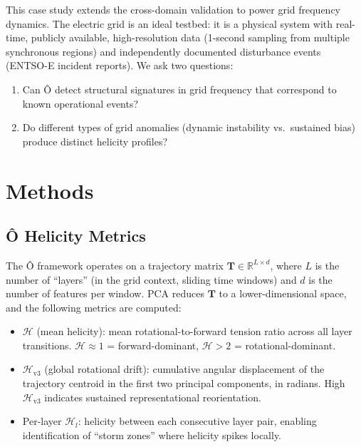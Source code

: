 \documentclass[11pt,a4paper]{article}
\begin{document}
This case study extends the cross-domain validation to power grid frequency dynamics. The electric grid is an ideal testbed: it is a physical system with real-time, publicly available, high-resolution data (1-second sampling from multiple synchronous regions) and independently documented disturbance events (ENTSO-E incident reports). We ask two questions:

\begin{enumerate}[label=(\arabic*)]
    \item Can Ô detect structural signatures in grid frequency that correspond to known operational events?
    \item Do different types of grid anomalies (dynamic instability vs.\ sustained bias) produce distinct helicity profiles?
\end{enumerate}

\section{Methods}

\subsection{Ô Helicity Metrics}

The Ô framework operates on a trajectory matrix $\mathbf{T} \in \mathbb{R}^{L \times d}$, where $L$ is the number of ``layers'' (in the grid context, sliding time windows) and $d$ is the number of features per window. PCA reduces $\mathbf{T}$ to a lower-dimensional space, and the following metrics are computed:

\begin{itemize}
    \item $\mathcal{H}$ (mean helicity): mean rotational-to-forward tension ratio across all layer transitions. $\mathcal{H} \approx 1$ = forward-dominant, $\mathcal{H} > 2$ = rotational-dominant.
    \item $\mathcal{H}_{\text{v3}}$ (global rotational drift): cumulative angular displacement of the trajectory centroid in the first two principal components, in radians. High $\mathcal{H}_{\text{v3}}$ indicates sustained representational reorientation.
    \item Per-layer $\mathcal{H}_l$: helicity between each consecutive layer pair, enabling identification of ``storm zones'' where helicity spikes locally.
\end{itemize}
\end{document}
